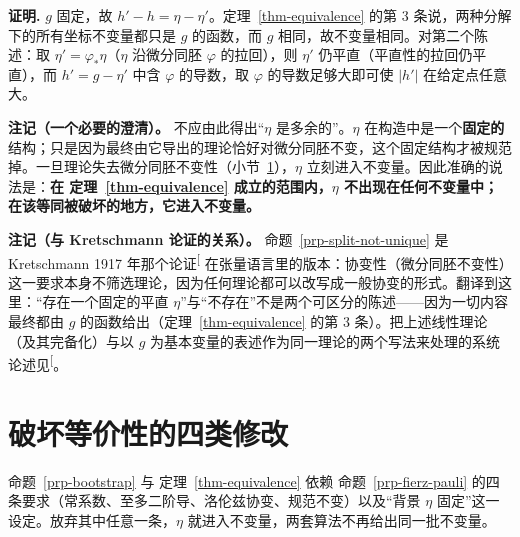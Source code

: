 \documentclass[
  chinese,
  a4paper,
  UTF8,
  12pt,
  oneside,
  openany]{ctexbook}
\theoremstyle{plain}
\theoremstyle{plain}
\theoremstyle{plain}
\theoremstyle{definition}
\theoremstyle{plain}
\theoremstyle{plain}
\theoremstyle{remark}
\begin{document}
\textbf{证明.} \(g\) 固定，故
\(h'-h=\eta-\eta'\)。定理~\ref{thm-equivalence} 的第 3
条说，两种分解下的所有坐标不变量都只是 \(g\) 的函数，而 \(g\)
相同，故不变量相同。对第二个陈述：取 \(\eta'=\varphi_{*}\eta\)（\(\eta\)
沿微分同胚 \(\varphi\) 的拉回），则 \(\eta'\)
仍平直（平直性的拉回仍平直），而 \(h'=g-\eta'\) 中含 \(\varphi\)
的导数，取 \(\varphi\) 的导数足够大即可使 \(|h'|\) 在给定点任意大。

\textbf{注记（一个必要的澄清）。} 不应由此得出``\(\eta\)
是多余的''。\(\eta\)
在构造中是一个\textbf{固定的}结构；只是因为最终由它导出的理论恰好对微分同胚不变，这个固定结构才被规范掉。一旦理论失去微分同胚不变性（小节~\ref{sec-fsg-breaking}），\(\eta\)
立刻进入不变量。因此准确的说法是：\textbf{在 定理~\ref{thm-equivalence}
成立的范围内，\(\eta\)
不出现在任何不变量中；在该等同被破坏的地方，它进入不变量。}

\textbf{注记（与 Kretschmann 论证的关系）。}
命题~\ref{prp-split-not-unique} 是 Kretschmann 1917
年那个论证\textsuperscript{{[}\citeproc{ref-kretschmann1917}{24}{]}}
在张量语言里的版本：协变性（微分同胚不变性）这一要求本身不筛选理论，因为任何理论都可以改写成一般协变的形式。翻译到这里：``存在一个固定的平直
\(\eta\)''与``不存在''不是两个可区分的陈述------因为一切内容最终都由
\(g\) 的函数给出（定理~\ref{thm-equivalence} 的第 3
条）。把上述线性理论（及其完备化）与以 \(g\)
为基本变量的表述作为同一理论的两个写法来处理的系统论述见\textsuperscript{{[}\citeproc{ref-wald1986}{25}{]}}。

\section{破坏等价性的四类修改}\label{sec-fsg-breaking}

命题~\ref{prp-bootstrap} 与 定理~\ref{thm-equivalence} 依赖
命题~\ref{prp-fierz-pauli}
的四条要求（常系数、至多二阶导、洛伦兹协变、规范不变）以及``背景
\(\eta\) 固定''这一设定。放弃其中任意一条，\(\eta\)
就进入不变量，两套算法不再给出同一批不变量。
\end{document}
